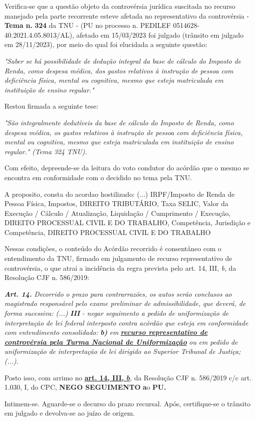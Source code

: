 \documentclass[12pt]{article}
\begin{document}
\justifying
\noindent Verifica-se que a questão objeto da controvérsia jurídica suscitada no recurso manejado pela parte recorrente esteve afetada no representativo da controvérsia - \textbf{Tema n. }\textbf{324} da TNU - (PU no processo n. PEDILEF 0514628-40.2021.4.05.8013/AL),  afetado em 15/03/2023 foi julgado (trânsito em julgado em 28/11/2023), por meio do qual foi elucidada a seguinte questão:

\noindent \textit{"Saber se há possibilidade de dedução integral da base de cálculo do Imposto de Renda, como despesa médica, dos gastos relativos à instrução de pessoa com deficiência física, mental ou cognitiva, mesmo que esteja matriculada em instituição de ensino regular."}

\noindent Restou firmada a seguinte tese:

\noindent \textit{"São integralmente dedutíveis da base de cálculo do Imposto de Renda, como despesa médica, os gastos relativos à instrução de pessoa com deficiência física, mental ou cognitiva, mesmo que esteja matriculada em instituição de ensino regular." (Tema 324 TNU).}

\noindent Com efeito, depreende-se da leitura do voto condutor do acórdão que o mesmo se encontra em conformidade com o decidido no  tema pela TNU.

\noindent A proposito, consta do acordao hostilizado: (...) IRPF/Imposto de Renda de Pessoa Física, Impostos, DIREITO TRIBUTÁRIO, Taxa SELIC, Valor da Execução / Cálculo / Atualização, Liquidação / Cumprimento / Execução, DIREITO PROCESSUAL CIVIL E DO TRABALHO, Competência, Jurisdição e Competência, DIREITO PROCESSUAL CIVIL E DO TRABALHO

\noindent Nessas condições, o conteúdo do Acórdão recorrido é consentâneo com o entendimento da TNU, firmado em julgamento de recurso representativo de controvérsia, o que atrai a incidência da regra prevista pelo art. 14, III, \textit{b,} da Resolução CJF n. 586/2019:

\noindent \textit{\textbf{Art. 14.}}\textit{ Decorrido o prazo para contrarrazões, os autos serão conclusos ao magistrado responsável pelo exame preliminar de admissibilidade, que deverá, de forma sucessiva: (...) }\textit{\textbf{III }}\textit{- negar seguimento a pedido de uniformização de interpretação de lei federal interposto contra acórdão que esteja em conformidade com entendimento consolidado: }\textit{\textbf{b)}}\textit{ em }\uline{\textit{\textbf{recurso representativo de controvérsia pela Turma Nacional de Uniformização}}}\textit{ ou em pedido de uniformização de interpretação de lei dirigido ao Superior Tribunal de Justiça;(...).}

\noindent Posto isso, com arrimo no \uline{\textbf{art. 14, III, }}\uline{\textit{\textbf{b}}}\textit{,} da Resolução CJF n. 586/2019 c/c art. 1.030, I, do CPC, \textbf{NEGO SEGUIMENTO }\textbf{a}o\textbf{ PU}\textbf{.}

\noindent Intimem-se. Aguarde-se o decurso do prazo recursal. Após, certifique-se o trânsito em julgado e devolva-se ao juízo de origem.
\end{document}

